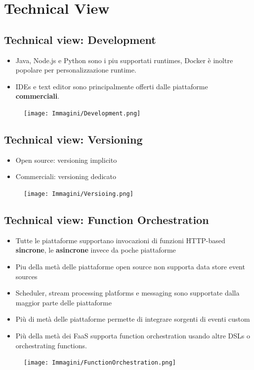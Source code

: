 \documentclass[a4paper, 12pt]{report}
\begin{document}
            \section{Technical View}
            \subsection{Technical view: Development}
            \begin{itemize}
              \item Java, Node.js e Python sono i piu supportati runtimes, Docker è inoltre popolare per personalizzazione runtime. 
              \item IDEs e text editor sono principalmente offerti dalle piattaforme \textbf{commerciali}.
            \end{itemize}
            \begin{figure}[h]
              \centering
              \texttt{[image: Immagini/Development.png]}
            \end{figure}
            \subsection{Technical view: Versioning}
            \begin{itemize}
              \item Open source: versioning implicito
              \item Commerciali: versioning dedicato
            \end{itemize}
            \begin{figure}[h]
              \centering
              \texttt{[image: Immagini/Versioing.png]}
            \end{figure}
            \subsection{Technical view: Function Orchestration}
            \begin{itemize}
              \item Tutte le piattaforme supportano invocazioni di funzioni HTTP-based \textbf{sincrone}, le \textbf{asincrone} invece da poche piattaforme
              \item Piu della metà delle piattaforme open source non supporta data store event sources
              \item Scheduler, stream processing platforms e messaging sono supportate dalla maggior parte delle piattaforme
              \item Più di metà delle piattaforme permette di integrare sorgenti di eventi custom
            \end{itemize}
            \begin{itemize}
              \item Più della metà dei FaaS supporta function orchestration usando altre DSLs o orchestrating functions.
            \end{itemize}
            \begin{figure}[h]
              \centering
              \texttt{[image: Immagini/FunctionOrchestration.png]}
            \end{figure}
\end{document}
